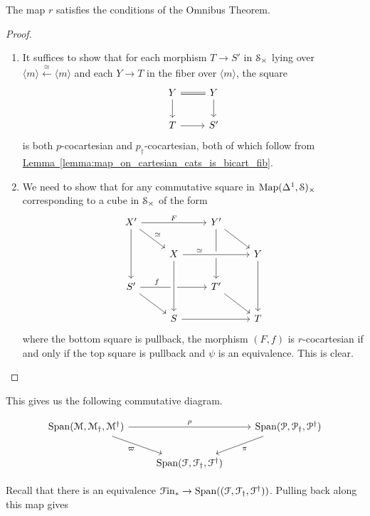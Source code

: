 \documentclass[main.tex]{subfiles}
\begin{document}
\begin{lemma}
  The map $r$ satisfies the conditions of the Omnibus Theorem.
\end{lemma}
\begin{proof}
  \leavevmode
  \begin{enumerate}
    \item It suffices to show that for each morphism $T \to S'$ in $\S_{\times}$ lying over $\langle m \rangle \overset{\cong}{\leftarrow} \langle m \rangle$ and each $Y \to T$ in the fiber over $\langle m \rangle$, the square
      \begin{equation*}
        \begin{tikzcd}
          Y
          \arrow[r, equals]
          \arrow[d]
          & Y
          \arrow[d]
          \\
          T
          \arrow[r]
          & S'
        \end{tikzcd}
      \end{equation*}
      is both $p$-cocartesian and $p_{\dagger}$-cocartesian, both of which follow from \hyperref[lemma:map_on_cartesian_cats_is_bicart_fib]{Lemma~\ref*{lemma:map_on_cartesian_cats_is_bicart_fib}}.

    \item We need to show that for any commutative square in $\Map(\Delta^{1}, \S)_{\times}$ corresponding to a cube in $\S_{\times}$ of the form
      \begin{equation*}
        \begin{tikzcd}
          X'
          \arrow[rr, "F"]
          \arrow[dd]
          \arrow[dr, "\simeq"]
          && Y'
          \arrow[dd]
          \arrow[dr]
          \\
          & X
          \arrow[rr, crossing over, near start, "\simeq"]
          && Y
          \arrow[dd]
          \\
          S'
          \arrow[dr]
          \arrow[rr, near start, "f"]
          && T'
          \arrow[dr]
          \\
          & S
          \arrow[from=uu, crossing over]
          \arrow[rr]
          && T
        \end{tikzcd}
      \end{equation*}
      where the bottom square is pullback, the morphism $(F, f)$ is $r$-cocartesian if and only if the top square is pullback and $\psi$ is an equivalence. This is clear.
  \end{enumerate}
\end{proof}

This gives us the following commutative diagram.

\begin{equation*}
  \begin{tikzcd}
    \Span\triple{M}
    \arrow[rr, "\rho"]
    \arrow[dr, swap, "\varpi"]
    && \Span\triple{P}
    \arrow[dl, "\pi"]
    \\
    & \Span\triple{F}
  \end{tikzcd}
\end{equation*}

Recall that there is an equivalence $\Finp \to \Span(\triple{F})$. Pulling back along this map gives 
\end{document}
